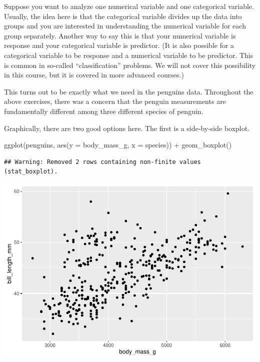 \documentclass[
]{book}
\newenvironment{Shaded}{\begin{snugshade}}{\end{snugshade}}
\newcommand{\AttributeTok}[1]{\textcolor[rgb]{0.77,0.63,0.00}{#1}}
\newcommand{\FunctionTok}[1]{\textcolor[rgb]{0.00,0.00,0.00}{#1}}
\newcommand{\NormalTok}[1]{#1}
\newcommand{\SpecialCharTok}[1]{\textcolor[rgb]{0.00,0.00,0.00}{#1}}
\begin{document}
Suppose you want to analyze one numerical variable and one categorical variable. Usually, the idea here is that the categorical variable divides up the data into groups and you are interested in understanding the numerical variable for each group separately. Another way to say this is that your numerical variable is response and your categorical variable is predictor. (It is also possible for a categorical variable to be response and a numerical variable to be predictor. This is common in so-called ``classification'' problems. We will not cover this possibility in this course, but it is covered in more advanced courses.)

This turns out to be exactly what we need in the penguins data. Throughout the above exercises, there was a concern that the penguin measurements are fundamentally different among three different species of penguin.

Graphically, there are two good options here. The first is a side-by-side boxplot.

\begin{Shaded}
\begin{Highlighting}[]
\FunctionTok{ggplot}\NormalTok{(penguins, }\FunctionTok{aes}\NormalTok{(}\AttributeTok{y =}\NormalTok{ body\_mass\_g, }\AttributeTok{x =}\NormalTok{ species)) }\SpecialCharTok{+}
    \FunctionTok{geom\_boxplot}\NormalTok{()}
\end{Highlighting}
\end{Shaded}

\begin{verbatim}
## Warning: Removed 2 rows containing non-finite values (stat_boxplot).
\end{verbatim}

\includegraphics{intro_stats_files/figure-latex/unnamed-chunk-105-1.pdf}
\end{document}
